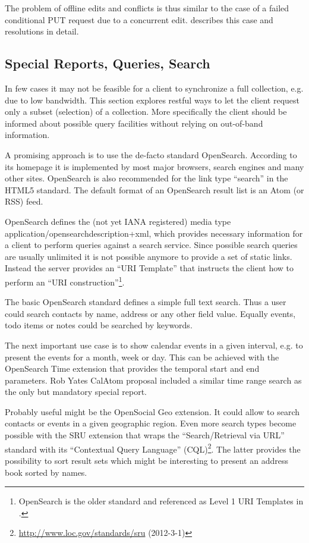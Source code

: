 \documentclass[12pt,a4paper,twoside]{scrartcl}		%
\newcommand{\citeurl}[2]{\url{#1} (#2)}
\begin{document}
The problem of offline edits and conflicts is thus similar to the case of a
failed conditional PUT request due to a concurrent edit. \cite{Nielsen1999}
describes this case and resolutions in detail.


\subsection{Special Reports, Queries, Search}
\label{sec:spec-reports-search}

In few cases it may not be feasible for a client to synchronize a full
collection, e.g. due to low bandwidth. This section explores restful ways to let
the client request only a subset (selection) of a collection. More specifically
the client should be informed about possible query facilities without relying on
out-of-band information.

A promising approach is to use the de-facto standard
OpenSearch\cite{Clinton}. According to its homepage it is implemented by most
major browsers, search engines and many other sites. OpenSearch is also
recommended for the link type ``search'' in the HTML5
standard\cite[sec. 4.12.4.12]{Hickson2011a}. The default format of an OpenSearch
result list is an Atom (or RSS) feed.

OpenSearch defines the (not yet IANA registered) media type
application/opensearchdescription+xml, which provides necessary information for
a client to perform queries against a search service. Since possible search
queries are usually unlimited it is not possible anymore to provide a set of
static links. Instead the server provides an ``URI Template''\cite{Gregorio2012}
that instructs the client how to perform an ``URI
construction''\footnote{OpenSearch is the older standard and referenced as Level
  1 URI Templates in \cite{Gregorio2012}.}.

The basic OpenSearch standard defines a simple full text search. Thus a user
could search contacts by name, address or any other field value. Equally events,
todo items or notes could be searched by keywords.

The next important use case is to show calendar events in a given interval,
e.g. to present the events for a month, week or day. This can be achieved with
the OpenSearch Time extension that provides the temporal start and end
parameters. Rob Yates CalAtom\cite{draft-yates-atompub-calatom-00.txt} proposal
included a similar time range search as the only but mandatory special report.

Probably useful might be the OpenSocial Geo extension. It could allow to search
contacts or events in a given geographic region. Even more search types become
possible with the SRU extension that wraps the ``Search/Retrieval via URL''
standard with its ``Contextual Query Language''
(CQL)\footnote{\citeurl{http://www.loc.gov/standards/sru}{2012-3-1}}. The latter
provides the possibility to sort result sets which might be interesting to
present an address book sorted by names.
\end{document}
